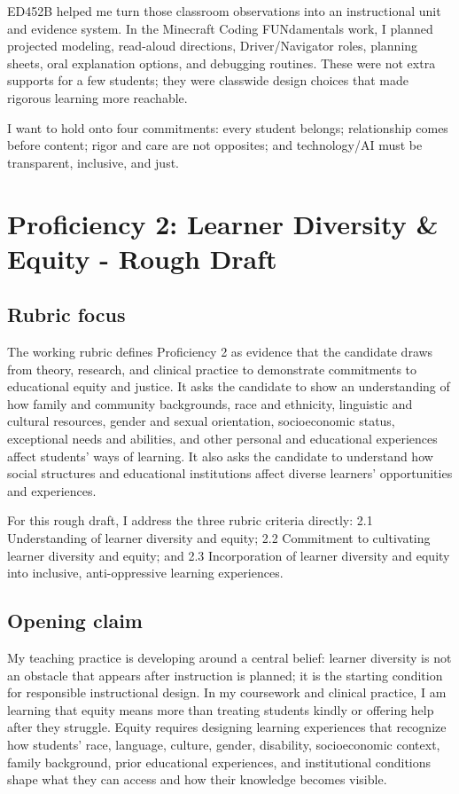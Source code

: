 \documentclass[12pt]{article}
\begin{document}
ED452B helped me turn those classroom observations into an instructional unit and evidence system. In the Minecraft Coding FUNdamentals work, I planned projected modeling, read-aloud directions, Driver/Navigator roles, planning sheets, oral explanation options, and debugging routines. These were not extra supports for a few students; they were classwide design choices that made rigorous learning more reachable.

I want to hold onto four commitments: every student belongs; relationship comes before content; rigor and care are not opposites; and technology/AI must be transparent, inclusive, and just.

\newpage
\section{Proficiency 2: Learner Diversity \& Equity - Rough Draft}

\subsection{Rubric focus}

The working rubric defines Proficiency 2 as evidence that the candidate draws from theory, research, and clinical practice to demonstrate commitments to educational equity and justice. It asks the candidate to show an understanding of how family and community backgrounds, race and ethnicity, linguistic and cultural resources, gender and sexual orientation, socioeconomic status, exceptional needs and abilities, and other personal and educational experiences affect students' ways of learning. It also asks the candidate to understand how social structures and educational institutions affect diverse learners' opportunities and experiences.

For this rough draft, I address the three rubric criteria directly: 2.1 Understanding of learner diversity and equity; 2.2 Commitment to cultivating learner diversity and equity; and 2.3 Incorporation of learner diversity and equity into inclusive, anti-oppressive learning experiences.

\subsection{Opening claim}

My teaching practice is developing around a central belief: learner diversity is not an obstacle that appears after instruction is planned; it is the starting condition for responsible instructional design. In my coursework and clinical practice, I am learning that equity means more than treating students kindly or offering help after they struggle. Equity requires designing learning experiences that recognize how students' race, language, culture, gender, disability, socioeconomic context, family background, prior educational experiences, and institutional conditions shape what they can access and how their knowledge becomes visible.
\end{document}
